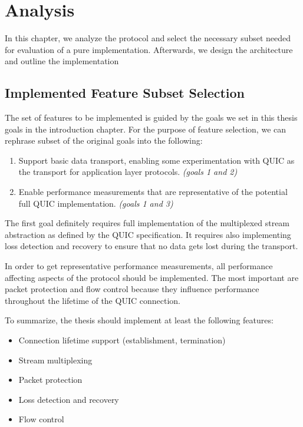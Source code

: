 \chapter{Analysis}\label{chap:03-analysis}

In this chapter, we analyze the protocol and select the necessary subset needed for evaluation of a
pure \dotnet{} implementation. Afterwards, we design the architecture and outline the implementation

\section{Implemented Feature Subset Selection}

The set of features to be implemented is guided by the goals we set in this thesis goals in the
introduction chapter. For the purpose of feature selection, we can rephrase subset of the original
goals into the following:

\begin{enumerate}

  \item Support basic data transport, enabling some experimentation with QUIC as the transport for
    application layer protocols. \textit{(goals 1 and 2)}

  \item Enable performance measurements that are representative of the potential full QUIC
    implementation. \textit{(goals 1 and 3)}

\end{enumerate}

The first goal definitely requires full implementation of the multiplexed stream abstraction as
defined by the QUIC specification. It requires also implementing loss detection and recovery to
ensure that no data gets lost during the transport.

In order to get representative performance measurements, all performance affecting aspects of the
protocol should be implemented. The most important are packet protection and flow control because
they influence performance throughout the lifetime of the QUIC connection.

To summarize, the thesis should implement at least the following features:

\begin{itemize}

    \item Connection lifetime support (establishment, termination)

    \item Stream multiplexing

    \item Packet protection

    \item Loss detection and recovery

    \item Flow control

\end{itemize}

